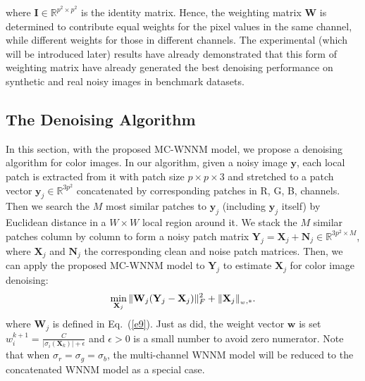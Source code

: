 \documentclass[10pt,twocolumn,letterpaper,sort&compress]{article}
\begin{document}
where $\mathbf{I}
\in\mathbb{R}^{p^{2}\times p^{2}}$ is the identity matrix. Hence, the weighting matrix $\mathbf{W}$ is determined to contribute equal weights for the pixel values in the same channel, while different weights for those in different channels. The experimental (which will be introduced later) results have already demonstrated that this form of weighting matrix have already generated the best denoising performance on synthetic and real noisy images in  benchmark datasets.




\subsection{The Denoising Algorithm}
In this section, with the proposed MC-WNNM model, we propose a denoising algorithm for color images. In our algorithm, given a noisy image $\mathbf{y}$, each local patch is extracted from it with patch size $p\times p \times 3$ and stretched to a patch vector $\mathbf{y}_{j}\in \mathbb{R}^{3p^{2}}$ concatenated by corresponding patches in R, G, B, channels. Then we search the $M$ most similar patches to $\mathbf{y}_{j}$ (including $\mathbf{y}_{j}$ itself) by Euclidean distance in a $W\times W$ local region around it. We stack the $M$ similar patches column by column to form a noisy patch matrix $\mathbf{Y}_{j}=\mathbf{X}_{j}+\mathbf{N}_{j}\in\mathbb{R}^{3p^{2}\times M}$, where $\mathbf{X}_{j}$ and $\mathbf{N}_{j}$ the corresponding clean and noise patch matrices. Then, we can apply the proposed MC-WNNM model to $\mathbf{Y}_{j}$ to estimate $\mathbf{X}_{j}$ for color image denoising:
\vspace{-1mm}
\begin{equation}
\label{e10}
\vspace{-1mm}
\min_{\mathbf{X}_{j}}
\|
\mathbf{W}_{j}
(\mathbf{Y}_{j}
-
\mathbf{X}_{j})
\|_{F}^{2}
+
\|
\mathbf{X}_{j}\|_{\bm_{w},*}.
\end{equation}
where $\mathbf{W}_{j}$ is defined in Eq.\ (\ref{e9}). Just as \cite{wnnmijcv} did, the weight vector $\bm{w}$ is set $w_{i}^{k+1}=\frac{C}{|\sigma_{i}(\mathbf{X}_{k})|+\epsilon }$ and $\epsilon>0$ is a small number to avoid zero numerator. Note that when $\sigma_{r}=\sigma_{g}=\sigma_{b}$, the multi-channel WNNM model will be reduced to the concatenated WNNM model as a special case.
\end{document}
